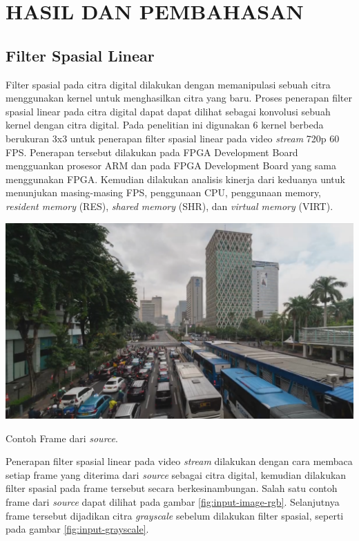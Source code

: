 
\chapter{HASIL DAN PEMBAHASAN}


\section{Filter Spasial Linear}
Filter spasial pada citra digital dilakukan dengan memanipulasi sebuah citra menggunakan kernel untuk menghasilkan citra yang baru. Proses penerapan filter spasial linear pada citra digital dapat dapat dilihat sebagai konvolusi sebuah kernel dengan citra digital. Pada penelitian ini digunakan 6 kernel berbeda berukuran 3x3 untuk penerapan filter spasial linear pada video \textit{stream} 720p 60 FPS. Penerapan tersebut dilakukan pada FPGA Development Board mengguankan prosesor ARM dan pada FPGA Development Board yang sama menggunakan FPGA. Kemudian dilakukan analisis kinerja dari keduanya untuk menunjukan masing-masing FPS, penggunaan CPU, penggunaan memory, \textit{resident memory} (RES), \textit{shared memory} (SHR), dan \textit{virtual memory} (VIRT).

\begin{afigure}
    \includegraphics[width=0.8\linewidth, center]{images/input-image/input1.png}
    \caption{Contoh Frame dari \textit{source}.}
    \label{fig:input-image-rgb}
\end{afigure}

Penerapan filter spasial linear pada video \textit{stream} dilakukan dengan cara membaca setiap frame yang diterima dari \textit{source} sebagai citra digital, kemudian dilakukan filter spasial pada frame tersebut secara berkesinambungan. 
Salah satu contoh frame dari \textit{source} dapat dilihat pada gambar \ref{fig:input-image-rgb}. Selanjutnya frame tersebut dijadikan citra \textit{grayscale} sebelum dilakukan filter spasial, seperti pada gambar \ref{fig:input-grayscale}.

